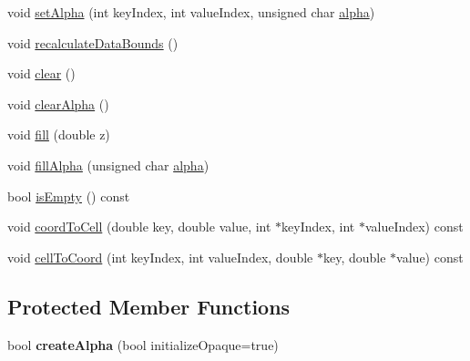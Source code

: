 \begin{DoxyCompactItemize}
\item 
void \mbox{\hyperlink{class_q_c_p_color_map_data_aaf7de5b34c58f38d8f4c1ceb064a876c}{set\+Alpha}} (int key\+Index, int value\+Index, unsigned char \mbox{\hyperlink{class_q_c_p_color_map_data_a4f7e6b7a97017400cbbd46f0660e68ea}{alpha}})
\item 
void \mbox{\hyperlink{class_q_c_p_color_map_data_ab235ade8a4d64bd3adb26a99b3dd57ee}{recalculate\+Data\+Bounds}} ()
\item 
void \mbox{\hyperlink{class_q_c_p_color_map_data_a9910ba830e96955bd5c8e5bef1e77ef3}{clear}} ()
\item 
void \mbox{\hyperlink{class_q_c_p_color_map_data_a14d08b9c3720cd719400079b86d3906b}{clear\+Alpha}} ()
\item 
void \mbox{\hyperlink{class_q_c_p_color_map_data_a350f783260eb9b5de5c7b5e0d5d3e3c2}{fill}} (double z)
\item 
void \mbox{\hyperlink{class_q_c_p_color_map_data_a93e2a549d7702bc849cd48a585294657}{fill\+Alpha}} (unsigned char \mbox{\hyperlink{class_q_c_p_color_map_data_a4f7e6b7a97017400cbbd46f0660e68ea}{alpha}})
\item 
bool \mbox{\hyperlink{class_q_c_p_color_map_data_aea88cc75a76ca571acf29b2ba8ac970d}{is\+Empty}} () const
\item 
void \mbox{\hyperlink{class_q_c_p_color_map_data_aca5b29e0ca2f299c9060fc6e1f74d0c8}{coord\+To\+Cell}} (double key, double value, int $\ast$key\+Index, int $\ast$value\+Index) const
\item 
void \mbox{\hyperlink{class_q_c_p_color_map_data_af1a36385c78ab624cd617065602408b6}{cell\+To\+Coord}} (int key\+Index, int value\+Index, double $\ast$key, double $\ast$value) const
\end{DoxyCompactItemize}
\subsection*{Protected Member Functions}
\begin{DoxyCompactItemize}
\item 
\mbox{\label{class_q_c_p_color_map_data_a42c2b1c303683515fa4de4c551f54441}} 
bool {\bfseries create\+Alpha} (bool initialize\+Opaque=true)
\end{DoxyCompactItemize}
